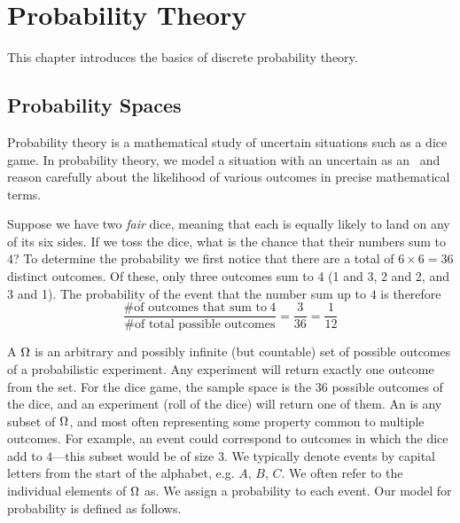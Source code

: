 \chapter{Probability Theory}
\label{ch:probability::theory}


\begin{preamble}
This chapter introduces the basics of discrete probability theory.
\end{preamble}

\section{Probability Spaces}
\label{sec:probability::theory::spaces}

\begin{gram}
Probability theory is a mathematical study of uncertain situations
such as a dice game.
%
In probability theory, we model a situation with an uncertain  as an~ and reason carefully about the likelihood of various outcomes in precise mathematical terms. 
%
\end{gram}

\begin{example}
Suppose we have two \emph{fair} dice, meaning that each is equally
likely to land on any of its six sides.  If we toss the dice, what is
the chance that their numbers sum to $4$?  
%
To determine the probability we first notice that there are a total of 
$6 \times 6 = 36$ distinct outcomes.
%
Of these, only three outcomes sum to 4 (1 and 3, 2 and 2,
and 3 and 1).
%
The probability of the event that the number sum up to $4$ is therefore
\begin{equation*}
\frac
{\text{\# of outcomes that sum to}~4}
{\text{\# of total possible outcomes}} 
= 
\frac{3}{36} = \frac{1}{12}
\end{equation*}

\end{example}
%


\begin{gram}
A  $\Omega{}$ is an arbitrary and possibly infinite
(but countable) set of possible outcomes of a probabilistic
experiment.   Any experiment will return exactly one outcome from the set.
%
For the dice game, the sample space is the 36 possible outcomes of the
dice, and an experiment (roll of the dice) will return one of them.  
%
An  is any subset of $\Omega$, and
most often representing some property common to multiple outcomes.  
%
For example, an event could correspond to outcomes in which the dice
add to $4$---this subset would be of size $3$.
%
We typically denote events by capital letters from the start
of the alphabet, e.g. $A$, $B$, $C$.
%
We often refer to the individual elements of $\Omega{}$ as.
%
We assign a probability to each event.
%
Our model for probability is defined as follows.
\end{gram}

